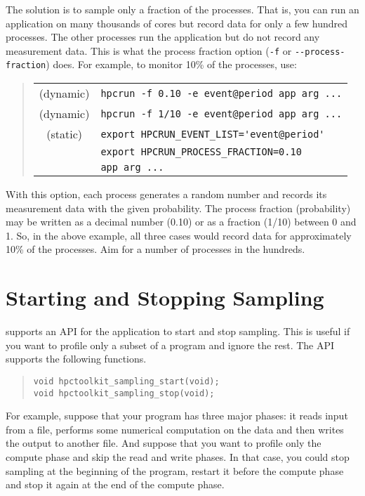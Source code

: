 The solution is to sample only a fraction of the processes.  That is,
you can run an application on many thousands of cores but record data
for only a few hundred processes.  The other processes run the
application but do not record any measurement data.  This is what the
process fraction option (\verb|-f| or \verb|--process-fraction|) does.
For example, to monitor 10\% of the processes, use:

\begin{quote}
\begin{tabular}{@{}cl}
(dynamic) & \verb|hpcrun -f 0.10 -e event@period app arg ...| \\
(dynamic) & \verb|hpcrun -f 1/10 -e event@period app arg ...| \\
(static)  & \verb|export HPCRUN_EVENT_LIST='event@period'| \\
& \verb|export HPCRUN_PROCESS_FRACTION=0.10| \\
& \verb|app arg ...|
\end{tabular}
\end{quote}

With this option, each process generates a random number and records
its measurement data with the given probability.  The process fraction
(probability) may be written as a decimal number (0.10) or as a
fraction (1/10) between 0 and 1.  So, in the above example, all three
cases would record data for approximately 10\% of the processes.  Aim
for a number of processes in the hundreds.


\section{Starting and Stopping Sampling}

\HPCToolkit{} supports an API for the application to start and stop
sampling.  This is useful if you want to profile only a subset of a
program and ignore the rest.  The API supports the following
functions.

\begin{quote}
\begin{verbatim}
void hpctoolkit_sampling_start(void);
void hpctoolkit_sampling_stop(void);
\end{verbatim}
\end{quote}

For example, suppose that your program has three major phases: it
reads input from a file, performs some numerical computation on the
data and then writes the output to another file.  And suppose that you
want to profile only the compute phase and skip the read and write
phases.  In that case, you could stop sampling at the beginning of the
program, restart it before the compute phase and stop it again at the
end of the compute phase.

